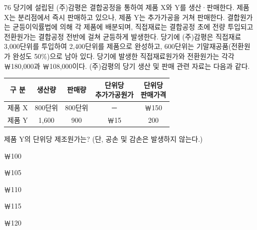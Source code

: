 \begin{question}{76}
당기에 설립된 (주)감평은 결합공정을 통하여 제품 X와 Y를 생산·판매한다. 제품 X는 분리점에서 즉시 판매하고 있으나, 제품 Y는 추가가공을 거쳐 판매한다. 결합원가는 균등이익률법에 의해 각 제품에 배분되며, 직접재료는 결합공정 초에 전량 투입되고 전환원가는 결합공정 전반에 걸쳐 균등하게 발생한다. 당기에 (주)감평은 직접재료 3,000단위를 투입하여 2,400단위를 제품으로 완성하고, 600단위는 기말재공품(전환원가 완성도 50\%)으로 남아 있다. 당기에 발생한 직접재료원가와 전환원가는 각각 ￦180,000과 ￦108,000이다. (주)감평의 당기 생산 및 판매 관련 자료는 다음과 같다.
\par{\small\centering\begin{tabular}{|c|c|c|c|c|}\hline
구 분 & 생산량 & 판매량 & \makecell{단위당\\추가가공원가} & \makecell{단위당\\판매가격} \\ \hline
제품 X & 800단위 & 800단위 & － & ￦150 \\ \hline
제품 Y & 1,600 & 900 & ￦15 & 200 \\ \hline
\end{tabular}\par}
제품 Y의 단위당 제조원가는? (단, 공손 및 감손은 발생하지 않는다.)
\begin{choices}
  \item ￦100
  \item ￦105
  \item ￦110
  \item ￦115
  \item ￦120
\end{choices}
\end{question}
